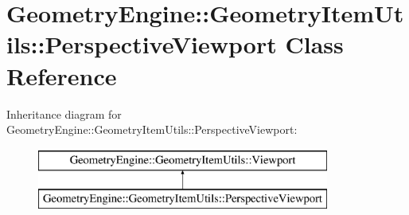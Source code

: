 \hypertarget{class_geometry_engine_1_1_geometry_item_utils_1_1_perspective_viewport}{}\section{Geometry\+Engine\+::Geometry\+Item\+Utils\+::Perspective\+Viewport Class Reference}
\label{class_geometry_engine_1_1_geometry_item_utils_1_1_perspective_viewport}
Inheritance diagram for Geometry\+Engine\+::Geometry\+Item\+Utils\+::Perspective\+Viewport\+:\begin{figure}[H]
\begin{center}
\leavevmode
\includegraphics[height=2.000000cm]{class_geometry_engine_1_1_geometry_item_utils_1_1_perspective_viewport}
\end{center}
\end{figure}
